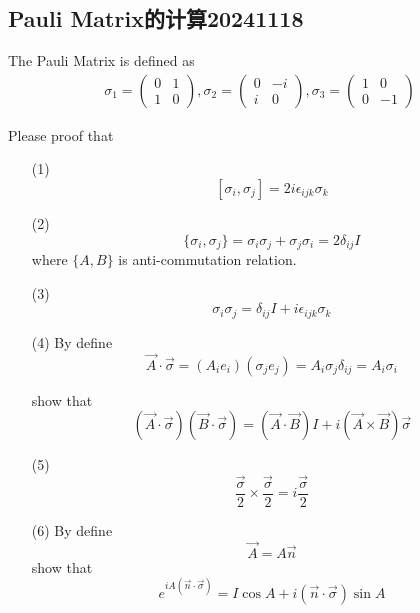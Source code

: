 \documentclass{article}
\newcommand{\pmtwo}[4]{
    \begin{pmatrix}
        #1&#2\\
        #3&#4
    \end{pmatrix}
    }
\begin{document}
\subsection{Pauli Matrix的计算20241118}

The Pauli Matrix is defined as 
\begin{align*}
    \sigma_1=\pmtwo{0}{1}{1}{0},\sigma_2=\pmtwo{0}{-i}{i}{0},\sigma_3=\pmtwo{1}{0}{0}{-1}
\end{align*}

Please proof that
\begin{enumerate}
    \item[(1)] \[[\sigma_i,\sigma_j]=2i\epsilon_{ijk}\sigma_k\]
    \item[(2)] \[\{\sigma_i,\sigma_j\}=\sigma_i\sigma_j+\sigma_j\sigma_i=2\delta_{ij}I\] where $\{A,B\} $ is anti-commutation relation. 
    \item[(3)] \[\sigma_i\sigma_j=\delta_{ij}I+i\epsilon_{ijk}\sigma_k\]
    \item[(4)] By define 
    \[\vec{A}\cdot\vec{\sigma}=(A_ie_i)(\sigma_je_j)=A_i\sigma_j\delta_{ij}=A_i\sigma_i\]

    show that
    \[(\vec{A}\cdot\vec{\sigma})(\vec{B}\cdot\vec{\sigma})=(\vec{A}\cdot \vec{B})I+i(\vec{A}\times \vec{B})\vec{\sigma}\]
    \item[(5)] \[\frac{\vec{\sigma}}{2}\times \frac{\vec{\sigma}}{2}=i\frac{\vec{\sigma}}{2}\]
    \item[(6)] By define
    \[\vec{A}=A\vec{n}\]
    show that
    \[e^{iA(\vec{n}\cdot\vec{\sigma})}=I\cos{A}+i(\vec{n}\cdot\vec{\sigma})\sin{A}\]
\end{enumerate}
\end{document}
